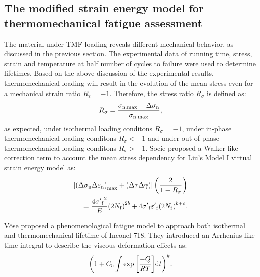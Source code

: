 \documentclass[preprint,5p,twocolumn,11pt,sort&compress]{elsarticle}
\begin{document}
\subsection{The modified strain energy model for thermomechanical fatigue assessment}
The material under TMF loading reveals different mechanical behavior, as discussed in the previous section. 
The experimental data of running time, stress, strain and temperature at half number of cycles to failure were used to determine lifetimes.
Based on the above discussion of the experimental results, thermomechanical loading  will result in the evolution of the mean stress even for a mechanical strain ratio $R_{\varepsilon}=-1$. Therefore, the stress ratio ${R_\sigma }$ is defined as:
\begin{equation}
{R_\sigma } = \frac{{{\sigma _{\rm n,\max }} - \Delta {\sigma _{\rm n}}}}{{{\sigma _{\rm n,\max }}}},
\end{equation}
as expected, under isothermal loading conditons ${R_\sigma }=-1$, under in-phase thermomechanical loading conditons ${R_\sigma }<-1$ and under out-of-phase thermomechanical loading conditons ${R_\sigma }>-1$.
Socie \cite{Socie2000} proposed a Walker-like correction term \cite{Walker1970} to account the mean stress dependency for Liu's Model I virtual strain energy model as:
\begin{equation}
\begin{aligned}
\left[ {{{\left( {\Delta {\sigma _{\rm n}}\Delta {\varepsilon _{\rm n}}} \right)}_{\max }} + \left( {\Delta \tau \Delta \gamma } \right)} \right]\left( {\frac{2}{{1 - {R_\sigma }}}} \right)\\
= \frac{{4{{\sigma '}_{\rm f}}^2}}{E}{\left( {2{N_{\rm f}}} \right)^{2b}} + 4{{\sigma '}_{\rm f}}{{\varepsilon '}_{\rm f}}{\left( {2{N_{\rm f}}} \right)^{b + c}}.
\end{aligned}
\label{Equ:StudyModel}
\end{equation}

V\"{o}se \cite{Vose2013} proposed a phenomenological fatigue model to approach both isothermal and thermomechanical lifetime of Inconel 718. They introduced an Arrhenius-like time integral to describe the viscous deformation effects as:
\begin{equation}
{\left( {1 + {C_5}\int {\exp \left[ {\frac{{ - Q}}{{RT}}} \right]} {\rm{d}}t} \right)^k}.
\end{equation}

\end{document}
